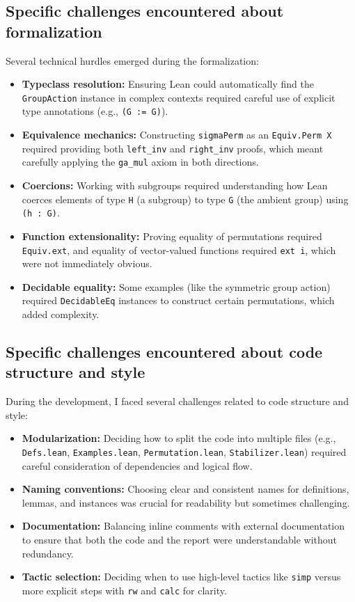 \documentclass[
  12pt, %
]{assignment}
\begin{document}
\subsection{Specific challenges encountered about formalization}
Several technical hurdles emerged during the formalization:
\begin{itemize}
	\item \textbf{Typeclass resolution:} Ensuring Lean could automatically find the \texttt{GroupAction}
	      instance in complex contexts required careful use of explicit type annotations (e.g., \texttt{(G := G)}).
	\item \textbf{Equivalence mechanics:} Constructing \texttt{sigmaPerm} as an \texttt{Equiv.Perm X}
	      required providing both \texttt{left\_inv} and \texttt{right\_inv} proofs, which meant carefully
	      applying the \texttt{ga\_mul} axiom in both directions.
	\item \textbf{Coercions:} Working with subgroups required understanding how Lean coerces elements
	      of type \texttt{H} (a subgroup) to type \texttt{G} (the ambient group) using \texttt{(h : G)}.
	\item \textbf{Function extensionality:} Proving equality of permutations required \texttt{Equiv.ext},
	      and equality of vector-valued functions required \texttt{ext i}, which were not immediately obvious.
	\item \textbf{Decidable equality:} Some examples (like the symmetric group action) required
	      \texttt{DecidableEq} instances to construct certain permutations, which added complexity.
\end{itemize}
\subsection{Specific challenges encountered about code structure and style}
During the development, I faced several challenges related to code structure and style:
\begin{itemize}
	\item \textbf{Modularization:} Deciding how to split the code into multiple files (e.g., \texttt{Defs.lean},
	      \texttt{Examples.lean}, \texttt{Permutation.lean}, \texttt{Stabilizer.lean}) required careful
	      consideration of dependencies and logical flow.
	\item \textbf{Naming conventions:} Choosing clear and consistent names for definitions,
	      lemmas, and instances was crucial for readability but sometimes challenging.
	\item \textbf{Documentation:} Balancing inline comments with external documentation to ensure
	      that both the code and the report were understandable without redundancy.
	\item \textbf{Tactic selection:} Deciding when to use high-level tactics like \texttt{simp} versus
	      more explicit steps with \texttt{rw} and \texttt{calc} for clarity.
\end{itemize}
\end{document}
